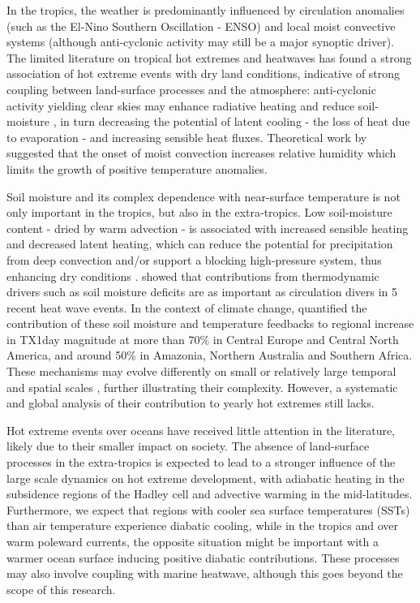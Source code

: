 \documentclass[11pt,a4paper,twoside,openright]{report}
\theoremstyle{definition}
\begin{document}
In the tropics, the weather is predominantly influenced by circulation anomalies (such as the El-Nino Southern Oscillation - ENSO) and local moist convective systems (although anti-cyclonic activity may still be a major synoptic driver). The limited literature on tropical hot extremes and heatwaves has found a strong association of hot extreme events with dry land conditions, indicative of strong coupling between land-surface processes and the atmosphere: anti-cyclonic activity yielding clear skies may enhance radiative heating and reduce soil-moisture \citep{geirinhas_climatic_2018,costa_most_2022}, in turn decreasing the potential of latent cooling - the loss of heat due to evaporation - and increasing sensible heat fluxes. Theoretical work by \cite{byrne_amplified_2021} suggested that the onset of moist convection increases relative humidity which limits the growth of positive temperature anomalies.

Soil moisture and its complex dependence with near-surface temperature is not only important in the tropics, but also in the extra-tropics. Low soil-moisture content - dried by warm advection - is associated with increased sensible heating and decreased latent heating, which can reduce the potential for precipitation from deep convection and/or support a blocking high-pressure system, thus enhancing dry conditions \citep{berg_impact_2014,wang_sensitivity_2019,miralles_mega-heatwave_2014,schumacher_amplification_2019}. \cite{wehrli_identifying_2019} showed that contributions from thermodynamic drivers such as soil moisture deficits are as important as circulation divers in 5 recent heat wave events. In the context of climate change, \cite{vogel_effects_2019} quantified the contribution of these soil moisture and temperature feedbacks to regional increase in TX1day magnitude at more than 70\% in Central Europe and Central North America, and around 50\% in Amazonia, Northern Australia and Southern Africa. These mechanisms may evolve differently on small or relatively large temporal and spatial scales \citep{mccoll_short-term_2019}, further illustrating their complexity. However, a systematic and global analysis of their contribution to yearly hot extremes still lacks.

Hot extreme events over oceans have received little attention in the literature, likely due to their smaller impact on society. The absence of land-surface processes in the extra-tropics is expected to lead to a stronger influence of the large scale dynamics on hot extreme development, with adiabatic heating in the subsidence regions of the Hadley cell and advective warming in the mid-latitudes. Furthermore, we expect that regions with cooler sea surface temperatures (SSTs) than air temperature experience diabatic cooling, while in the tropics and over warm poleward currents, the opposite situation might be important with a warmer ocean surface inducing positive diabatic contributions. These processes may also involve coupling with marine heatwave, although this goes beyond the scope of this research.
\end{document}
